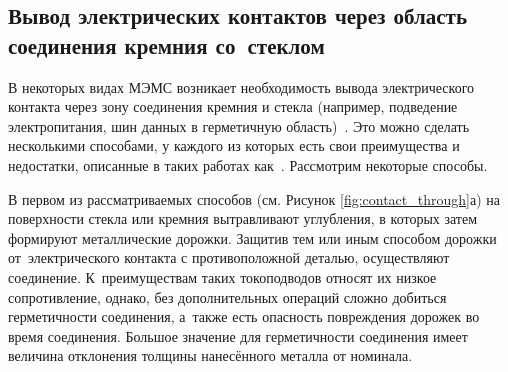 \subsection{Вывод электрических контактов через область соединения кремния со~стеклом}
В некоторых видах МЭМС возникает необходимость вывода электрического контакта через зону соединения кремния и стекла (например, подведение электропитания, шин данных в герметичную область)~\cite{Vacuum_Packaging_Technology_and_Appl}. Это можно сделать несколькими способами, у каждого из которых есть свои преимущества и недостатки, описанные в таких работах как~\cite{Jakobsen_AB_for_MEMS_2001_ppt,tanaka2007laterally,Babaevskij_el_vyvody_NMST2014_4,barinov2015_datchik_zhestk}. Рассмотрим некоторые способы.

В первом из рассматриваемых способов (см. Рисунок \ref{fig:contact_through}а)
на поверхности стекла или кремния вытравливают углубления, в которых затем формируют металлические дорожки. Защитив тем или иным способом дорожки от~электрического контакта с противоположной деталью, осуществляют соединение. К~преимуществам таких токоподводов относят их низкое сопротивление, однако, без дополнительных операций сложно добиться герметичности соединения, а~также есть опасность повреждения дорожек во время соединения. Большое значение для герметичности соединения имеет величина отклонения толщины нанесённого металла от номинала.
